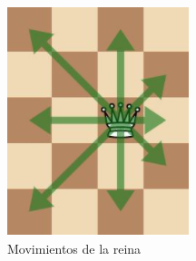 \documentclass[conference]{IEEEtran}
\begin{document}
    \begin{figure}[h!]
    \centering
    \begin{subfigure}[b]{0.45\linewidth}
    \includegraphics[width=\linewidth]{images/Capturep05.PNG}
    \caption{Movimientos de la reina}
    \label{fig:reinaM}
    \end{subfigure}
    \begin{subfigure}[b]{0.45\linewidth}

\end{subfigure}
\end{figure}
\end{document}

